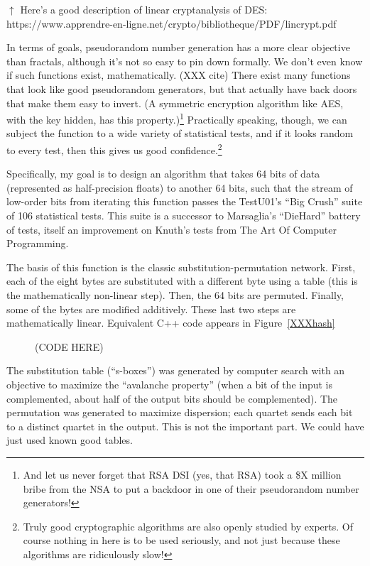 \documentclass[twocolumn]{article}
\begin{document}
$\uparrow$ Here's a good description of linear cryptanalysis of DES: https://www.apprendre-en-ligne.net/crypto/bibliotheque/PDF/lincrypt.pdf

In terms of goals, pseudorandom number generation has a more clear objective than fractals, although it's not so easy to pin down formally. We don't even know if such functions exist, mathematically. (XXX cite) There exist many functions that look like good pseudorandom generators, but that actually have back doors that make them easy to invert. (A symmetric encryption algorithm like AES, with the key hidden, has this property.)\footnote{And let us never forget that RSA DSI (yes, that RSA) took a \$X million bribe from the NSA to put a backdoor in one of their pseudorandom number generators!} Practically speaking, though, we can subject the function to a wide variety of statistical tests, and if it looks random to every test, then this gives us good confidence.\footnote{Truly good cryptographic algorithms are also openly studied by experts. Of course nothing in here is to be used seriously, and not just because these algorithms are ridiculously slow!}

Specifically, my goal is to design an algorithm that takes 64 bits of data (represented as half-precision floats) to another 64 bits, such that the stream of low-order bits from iterating this function passes the TestU01's ``Big Crush'' suite of 106 statistical tests\cite{XXXbigcrush}. This suite is a successor to Marsaglia's ``DieHard'' battery of tests\cite{XXXmarsaglia}, itself an improvement on Knuth's tests from The Art Of Computer Programming\cite{XXXknuth}.

The basis of this function is the classic substitution-permutation network. First, each of the eight bytes are substituted with a different byte using a table (this is the mathematically non-linear step). Then, the 64 bits are permuted. Finally, some of the bytes are modified additively. These last two steps are mathematically linear. Equivalent C++ code appears in Figure~\ref{XXXhash}

\begin{figure}
(CODE HERE)
\end{figure}

The substitution table (``s-boxes'') was generated by computer search with an objective to maximize the ``avalanche property'' (when a bit of the input is complemented, about half of the output bits should be complemented). The permutation was generated to maximize dispersion; each quartet sends each bit to a distinct quartet in the output. This is not the important part. We could have just used known good tables.
\end{document}

